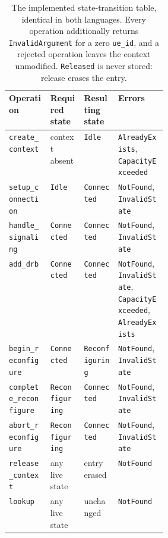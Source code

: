 \documentclass[english,twoside,openright,a4paper,censored,csm,software-track-2020]{HYthesisML}
\begin{document}
\begin{table}
\centering
\small
\caption[The implemented state-transition table]{The implemented state-transition table, identical in both languages. Every operation
additionally returns \texttt{InvalidArgument} for a zero \texttt{ue\_id}, and a rejected
operation leaves the context unmodified. \texttt{Released} is never stored: release erases
the entry.\label{tab:transitions}}
\begin{tabular}{@{}l l l R{0.31\linewidth}@{}}
\hline\hline
Operation & Required state & Resulting state & Errors \\
\hline
\texttt{create\_context}       & context absent   & \texttt{Idle}          & \texttt{AlreadyExists}, \texttt{CapacityExceeded} \\
\texttt{setup\_connection}     & \texttt{Idle}          & \texttt{Connected}     & \texttt{NotFound}, \texttt{InvalidState} \\
\texttt{handle\_signaling}     & \texttt{Connected}     & \texttt{Connected}     & \texttt{NotFound}, \texttt{InvalidState} \\
\texttt{add\_drb}              & \texttt{Connected}     & \texttt{Connected}     & \texttt{NotFound}, \texttt{InvalidState}, \texttt{CapacityExceeded}, \texttt{AlreadyExists} \\
\texttt{begin\_reconfigure}    & \texttt{Connected}     & \texttt{Reconfiguring} & \texttt{NotFound}, \texttt{InvalidState} \\
\texttt{complete\_reconfigure} & \texttt{Reconfiguring} & \texttt{Connected}     & \texttt{NotFound}, \texttt{InvalidState} \\
\texttt{abort\_reconfigure}    & \texttt{Reconfiguring} & \texttt{Connected}     & \texttt{NotFound}, \texttt{InvalidState} \\
\texttt{release\_context}      & any live state   & entry erased           & \texttt{NotFound} \\
\texttt{lookup}                & any live state   & unchanged              & \texttt{NotFound} \\
\hline
\end{tabular}
\end{table}
\end{document}
